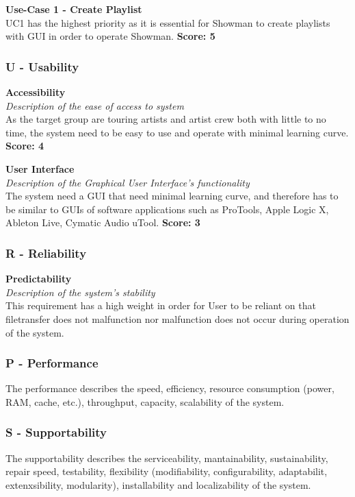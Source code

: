 \textbf{Use-Case 1 - Create Playlist} \\
UC1 has the highest priority as it is essential for Showman to create playlists with GUI in order to operate Showman. \newline
\textbf{Score: 5} \\

\subsubsection{\textbf{U} - Usability}
\textbf{Accessibility} \\
\textit{Description of the ease of access to system} \\
As the target group are touring artists and artist crew both with little to no time, the system need to be easy to use and operate with minimal learning curve. \newline
\textbf{Score: 4} \newline

\textbf{User Interface} \\
\textit{Description of the Graphical User Interface's functionality} \\
The system need a GUI that need minimal learning curve, and therefore has to be similar to GUIs of software applications such as ProTools, Apple Logic X, Ableton Live, Cymatic Audio uTool. \newline
\textbf{Score: 3}

\subsubsection{\textbf{R} - Reliability}
\textbf{Predictability} \\
\textit{Description of the system's stability} \\
This requirement has a high weight in order for User to be reliant on that filetransfer does not malfunction nor malfunction does not occur during operation of the system.

\subsubsection{\textbf{P} - Performance}
The performance describes the speed, efficiency, resource consumption (power, RAM, cache, etc.), throughput, capacity, scalability of the system. \\

\subsubsection{\textbf{S} - Supportability}
The supportability describes the serviceability, mantainability, sustainability, repair speed, testability, flexibility (modifiability, configurability, adaptabilit, extenxsibility, modularity), installability and localizability of the system. \\

